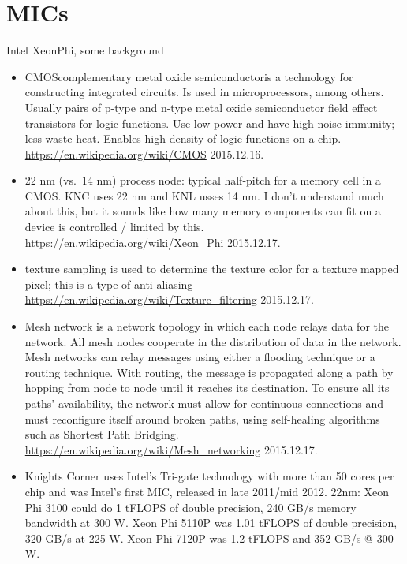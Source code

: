 \documentclass[12pt,twoside]{article}
\begin{document}
\section*{MICs}
Intel XeonPhi, some background
\begin{itemize}
\item CMOS\textemdash complementary metal oxide semiconductor\textemdash is a technology for constructing integrated circuits. Is used in microprocessors, among others. Usually pairs of p-type and n-type metal oxide semiconductor field effect transistors for logic functions. Use low power and have high noise immunity; less waste heat. Enables high density of logic functions on a chip. \href{https://en.wikipedia.org/wiki/CMOS}{https://en.wikipedia.org/wiki/CMOS} 2015.12.16.

\item 22 nm (vs.\ 14 nm) process node: typical half-pitch for a memory cell in a CMOS. KNC uses 22 nm and KNL usses 14 nm. I don't understand much about this, but it sounds like how many memory components can fit on a device is controlled / limited by this. \href{https://en.wikipedia.org/wiki/Xeon_Phi}{https://en.wikipedia.org/wiki/Xeon\_Phi} 2015.12.17.

\item texture sampling is used to determine the texture color for a texture mapped pixel; this is a type of anti-aliasing \href{https://en.wikipedia.org/wiki/Texture_filtering}{https://en.wikipedia.org/wiki/Texture\_filtering} 2015.12.17.

\item Mesh network is a network topology in which each node relays data for the network. All mesh nodes cooperate in the distribution of data in the network. Mesh networks can relay messages using either a flooding technique or a routing technique. With routing, the message is propagated along a path by hopping from node to node until it reaches its destination. To ensure all its paths' availability, the network must allow for continuous connections and must reconfigure itself around broken paths, using self-healing algorithms such as Shortest Path Bridging. \href{https://en.wikipedia.org/wiki/Mesh_networking}{https://en.wikipedia.org/wiki/Mesh\_networking} 2015.12.17.

\item Knights Corner uses Intel's Tri-gate technology with more than 50 cores per chip and was Intel's first MIC, released in late 2011/mid 2012. 22nm: Xeon Phi 3100 could do 1 tFLOPS of double precision, 240 GB/s memory bandwidth at 300 W. Xeon Phi 5110P was 1.01 tFLOPS of double precision, 320 GB/s at 225 W. Xeon Phi 7120P was 1.2 tFLOPS and 352 GB/s @ 300 W.


\end{itemize}
\end{document}
